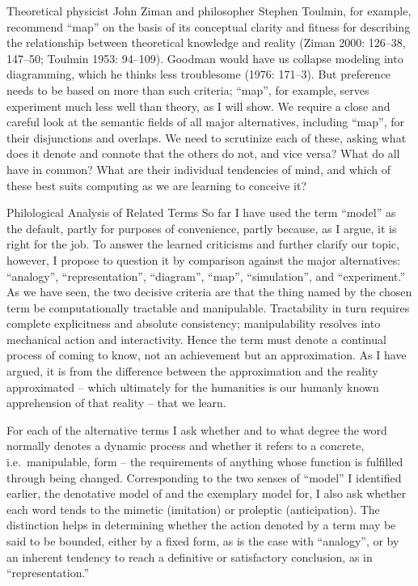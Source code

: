 Theoretical physicist John Ziman and philosopher Stephen Toulmin, for
example, recommend ``map'' on the basis of its conceptual clarity and
fitness for describing the relationship between theoretical knowledge
and reality (Ziman 2000: 126--38, 147--50; Toulmin 1953: 94--109).
Goodman would have us collapse modeling into diagramming, which he
thinks less troublesome (1976: 171--3). But preference needs to be based
on more than such criteria; ``map'', for example, serves experiment much
less well than theory, as I will show. We require a close and careful
look at the semantic fields of all major alternatives, including
``map'', for their disjunctions and overlaps. We need to scrutinize each
of these, asking what does it denote and connote that the others do not,
and vice versa? What do all have in common? What are their individual
tendencies of mind, and which of these best suits computing as we are
learning to conceive it?

Philological Analysis of Related Terms So far I have used the term
``model'' as the default, partly for purposes of convenience, partly
because, as I argue, it is right for the job. To answer the learned
criticisms and further clarify our topic, however, I propose to question
it by comparison against the major alternatives: ``analogy'',
``representation'', ``diagram'', ``map'', ``simulation'', and
``experiment.'' As we have seen, the two decisive criteria are that the
thing named by the chosen term be computationally tractable and
manipulable. Tractability in turn requires complete explicitness and
absolute consistency; manipulability resolves into mechanical action and
interactivity. Hence the term must denote a continual process of coming
to know, not an achievement but an approximation. As I have argued, it
is from the difference between the approximation and the reality
approximated -- which ultimately for the humanities is our humanly known
apprehension of that reality -- that we learn.

For each of the alternative terms I ask whether and to what degree the
word normally denotes a dynamic process and whether it refers to a
concrete, i.e.~manipulable, form -- the requirements of anything whose
function is fulfilled through being changed. Corresponding to the two
senses of ``model'' I identified earlier, the denotative model of and
the exemplary model for, I also ask whether each word tends to the
mimetic (imitation) or proleptic (anticipation). The distinction helps
in determining whether the action denoted by a term may be said to be
bounded, either by a fixed form, as is the case with ``analogy'', or by
an inherent tendency to reach a definitive or satisfactory conclusion,
as in ``representation.''

